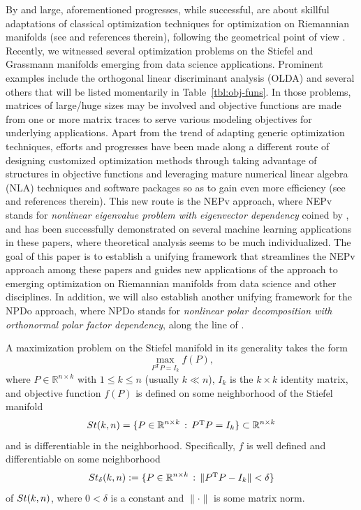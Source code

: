 \documentclass[11pt]{article}
\def\bbR{\mathbb{R}}
\newcommand\STM[2]{{\rm St}(#1,#2)}
\newcommand\STMnbr{{\rm St}_{\delta}(k,n)}
\DeclareMathOperator{\T}{T}
\theoremstyle{definition}
\numberwithin{equation}{section}
\begin{document}
By and large, aforementioned progresses, while successful, are about skillful adaptations of classical optimization techniques
for optimization on Riemannian manifolds
(see \cite{abms:2008,manopt,edas:1999,galc:2018,wagl:2021,weyi:2013} and references therein), following
the geometrical point of view \cite{edas:1999}. Recently, we witnessed several  optimization problems on the Stiefel and Grassmann manifolds emerging from
data science applications. Prominent examples include the orthogonal linear discriminant analysis (OLDA)
and several others that will be listed momentarily in Table~\ref{tbl:obj-funs}. In those problems, matrices of large/huge sizes may be involved
and objective functions are made from one or more matrix traces to serve various modeling objectives for underlying applications.
Apart from the trend of adapting generic optimization techniques, efforts and progresses have been made along a different route of designing
customized optimization methods through taking advantage of structures in objective
functions  and leveraging mature numerical linear algebra (NLA)
techniques and software packages so as to gain even more efficiency
(see \cite{wazl:2023,zhys:2020,zhli:2014a,zhli:2014b,zhwb:2022} and references therein). This new route is
the NEPv approach, where NEPv stands for {\em nonlinear eigenvalue problem with eigenvector dependency\/} coined by \cite{cazb:2018},
and has been successfully demonstrated on several machine learning applications in these papers, where theoretical analysis seems to be much
individualized.
The goal of this paper is to establish a unifying framework that streamlines the NEPv approach among these papers
and guides new applications of the approach to  emerging optimization on Riemannian manifolds from
data science and other disciplines. In addition, we will also establish another unifying framework for the NPDo
approach, where NPDo stands for {\em nonlinear polar decomposition with orthonormal polar factor  dependency}, along the line of
\cite{wazl:2022a}.


A maximization problem on the Stiefel manifold in its generality takes the form
\begin{equation}\label{eq:main-opt}
\max_{P^{\T}P=I_k}f(P),
\end{equation}
where $P\in\bbR^{n\times k}$ with $1\le k\le n$ (usually $k\ll n$), $I_k$ is the $k\times k$ identity matrix, and
objective function $f(P)$ is defined on some neighborhood of the Stiefel manifold
\begin{equation}\label{eq:STM}
\STM{k}{n}=\{P\in\bbR^{n\times k}\,:\,P^{\T}P=I_k\}\subset\bbR^{n\times k}
\end{equation}
and is differentiable in the neighborhood. Specifically,
$f$ is well defined and differentiable on some neighborhood
\begin{equation}\label{eq:O-delta}
\STMnbr:=\{P\in\bbR^{n\times k}\,:\,\|P^{\T}P-I_k\|<\delta\}
\end{equation}
 of $\STM{k}{n}$,
where $0<\delta$ is a constant and $\|\cdot\|$ is some matrix norm.
\end{document}
